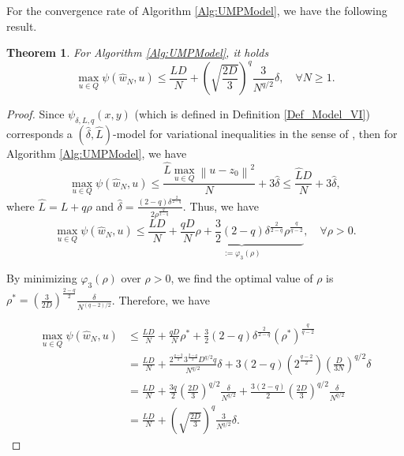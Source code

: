 \documentclass[11pt]{amsart}
\newtheorem{theorem}{Theorem}[section]
\theoremstyle{definition}
\numberwithin{equation}{section}
\begin{document}
For the convergence rate of  Algorithm \ref{Alg:UMPModel}, we have the following result.

\begin{theorem}\label{thmm1inexact}
For Algorithm \ref{Alg:UMPModel}, it holds 
\begin{equation}\label{rate_VIs}
    \max\limits_{u \in Q}\psi(\widehat{w}_N,u) \leq \frac{LD}{N} + \left(\sqrt{\frac{2D}{3}}\right)^q \frac{3}{N^{q/2}}  \delta, \quad \forall N \geq 1.
\end{equation}
\end{theorem}

\begin{proof}
Since $\psi_{\delta, L, q}(x,y)$ (which is defined in Definition \ref{Def_Model_VI}) corresponds a $(\widehat{\delta}, \widehat{L})$-model for variational inequalities in the sense of \cite{Stonyakin2021OMS}, then for Algorithm \ref{Alg:UMPModel}, we have
\[
    \max\limits_{u \in Q}\psi(\widehat{w}_N,u) \leq \frac{\widehat{L} \max_{u \in Q} \left\|u -z_0\right\|^2}{N} + 3 \widehat{\delta} \leq  \frac{ \widehat{L} D}{N}  + 3 \widehat{\delta},
\]
where $\widehat{L} = L + q \rho$ and $ \widehat{\delta} = \frac{(2-q) \delta^{\frac{2}{2-q}}}{2 \rho^{\frac{q}{2-q}}}.$ Thus, we have
\[
    \max\limits_{u \in Q}\psi(\widehat{w}_N,u) \leq \frac{LD}{N} + \underbrace{\frac{q D}{N}\rho + \frac{3}{2} (2-q) \delta^{\frac{2}{2-q}} \rho^{\frac{q}{q-2}}}_{:=\varphi_3(\rho)}, \quad \forall \rho >0. 
\]

By minimizing $\varphi_3(\rho)$ over $\rho >0$, we find the optimal value of $\rho$ is  $\rho^* = \left(\frac{3}{2D}\right)^{\frac{2-q}{2}} \frac{\delta}{N^{(q-2)/2}}$. Therefore, we have
 
\begin{align*}
    \max\limits_{u \in Q}\psi(\widehat{w}_N,u)
    & \leq \frac{LD}{N} + \frac{q D}{N}\rho^* + \frac{3}{2} (2-q) \delta^{\frac{2}{2-q}} (\rho^*)^{\frac{q}{q-2}}
    \\& = \frac{LD}{N} + \frac{2^{\frac{q-2}{2}}  3^{\frac{2-q}{2}} D^{q/2} q}{N^{q/2}  }  \delta + 3 (2-q) \left(2^{\frac{q-2}{2}}\right)  \left (\frac{D}{3N}\right)^{q/2}   \delta
    \\& = \frac{LD}{N} + \frac{3q}{2}\left (\frac{2D}{3}\right)^{q/2}   \frac{\delta}{N^{q/2}} +  \frac{3(2-q)}{2}  \left (\frac{2D}{3}\right)^{q/2}   \frac{\delta}{N^{q/2}}
    \\& = \frac{LD}{N} + \left(\sqrt{\frac{2D}{3}}\right)^q \frac{3}{N^{q/2}}  \delta. 
\end{align*}
\end{proof}
\end{document}
